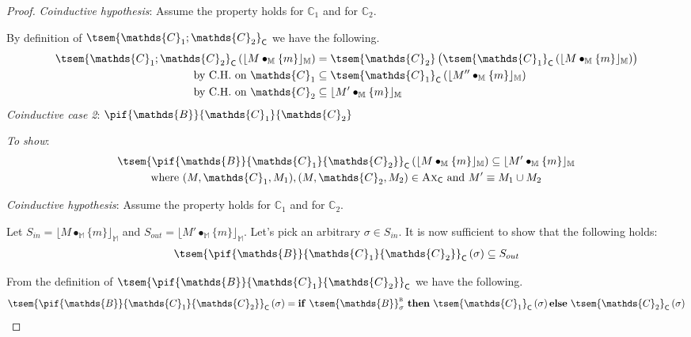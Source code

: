 {\begin{proof}
\textit{Coinductive hypothesis}: Assume the property holds for $\mathds{C}_1$ and for $\mathds{C}_2$.

By definition of $\tsem{\mathds{C}_1 ; \mathds{C}_2}_\mathsf{C}$ we have the following.
\begin{align*}
	\tsem{\mathds{C}_1 ; \mathds{C}_2}_\mathsf{C} \left( \lfloor M \bullet_\mathbb{M} \{m\} \rfloor_\mathbb{M} \right)
	&=
	\tsem{\mathds{C}_2}\left( \tsem{\mathds{C}_1}_\mathsf{C} \left( \lfloor M \bullet_\mathbb{M} \{m\}\rfloor_\mathbb{M}\right) \right) \\
	\text{by C.H. on } \mathds{C}_1 &\subseteq
	\tsem{\mathds{C}_1}_\mathsf{C} \left( \lfloor M'' \bullet_\mathbb{M} \{m\} \rfloor_\mathbb{M} \right) \\
	\text{by C.H. on } \mathds{C}_2 &\subseteq
	\lfloor M' \bullet_\mathbb{M} \{m\} \rfloor_\mathbb{M}
\end{align*}
\indline
\textit{Coinductive case 2}: $\pif{\mathds{B}}{\mathds{C}_1}{\mathds{C}_2}$

\textit{To show}:
\begin{gather*}
	\tsem{\pif{\mathds{B}}{\mathds{C}_1}{\mathds{C}_2}}_\mathsf{C} \left( \lfloor M \bullet_\mathbb{M} \{m\} \rfloor_\mathbb{M} \right) \subseteq \lfloor M' \bullet_\mathbb{M} \{m\} \rfloor_\mathbb{M}
	\\
	\text{where } (M, \mathds{C}_1, M_1), (M, \mathds{C}_2, M_2) \in \textsc{Ax}_\mathsf{C} \text{ and } M' \equiv M_1 \cup M_2
\end{gather*}

\textit{Coinductive hypothesis}: Assume the property holds for $\mathds{C}_1$ and for $\mathds{C}_2$.

Let $S_{in} = \lfloor M \bullet_\mathbb{M} \{m\} \rfloor_\mathbb{M}$ and $S_{out} = \lfloor M' \bullet_\mathbb{M} \{m\} \rfloor_\mathbb{M}$. Let's pick an arbitrary $\sigma \in S_{in}$. It is now sufficient to show that the following holds:
\begin{gather*}
	\tsem{\pif{\mathds{B}}{\mathds{C}_1}{\mathds{C}_2}}_\mathsf{C} \left( \sigma \right) \subseteq S_{out}
\end{gather*}

From the definition of $\tsem{\pif{\mathds{B}}{\mathds{C}_1}{\mathds{C}_2}}_\mathsf{C}$ we have the following.
\[
	\tsem{\pif{\mathds{B}}{\mathds{C}_1}{\mathds{C}_2}}_\mathsf{C} \left( \sigma \right)
		= 
	\mathbf{if}\ \tsem{\mathds{B}}_\sigma^\textsc{b}\ \mathbf{then}\ \tsem{\mathds{C}_1}_\mathsf{C}\left( \sigma \right) \mathbf{else}\ \tsem{\mathds{C}_2}_\mathsf{C}\left( \sigma \right)
\]


\end{proof}}
